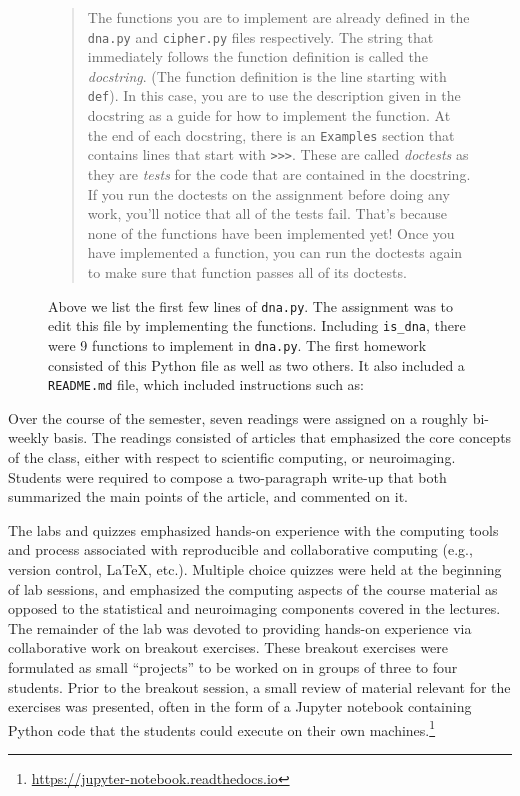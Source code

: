 
\begin{figure}
\centering

\caption{Above we list the first few lines of \texttt{dna.py}.
The assignment was to edit this file by implementing the functions.
Including \texttt{is\_dna}, there were 9 functions
to implement in \texttt{dna.py}.
The first homework consisted of this Python file as well as two others.
It also included a \texttt{README.md} file, which included instructions
such as:}\label{fig:dna}
\begin{quotation}
The functions you are to implement are already defined in the \texttt{dna.py} and
\texttt{cipher.py} files respectively. The string that immediately follows the function
definition is called the \emph{docstring}. (The function definition is the line
starting with \texttt{def}). In this case, you are to use the description given in the
docstring as a guide for how to implement the function. At the end of each
docstring, there is an \texttt{Examples} section that contains lines that start with
\verb|>>>|. These are called \emph{doctests} as they are \emph{tests} for the code that are
contained in the docstring. If you run the doctests on the assignment before
doing any work, you'll notice that all of the tests fail. That's because none
of the functions have been implemented yet! Once you have implemented a
function, you can run the doctests again to make sure that function passes all
of its doctests.
\end{quotation}
\end{figure}

Over the course of the semester, seven readings were assigned on a roughly
bi-weekly basis.
The readings consisted of articles that emphasized the core concepts
of the class, either with respect to scientific computing, or neuroimaging.
Students were required to compose a two-paragraph write-up that both summarized
the main points of the article, and commented on it.

The labs and quizzes emphasized hands-on experience with the computing tools
and process associated with reproducible and collaborative computing (e.g.,
version control, \LaTeX, etc.).
Multiple choice quizzes were held at the beginning of lab sessions, and
emphasized the computing aspects of the course material as
opposed to the statistical and neuroimaging components covered in the lectures.
The remainder of the lab was devoted to providing hands-on experience via
collaborative work on breakout exercises.
These breakout exercises were formulated as small ``projects'' to be worked on
in groups of three to four students.
Prior to the breakout session, a small review of material relevant for the
exercises was presented, often in the form of a Jupyter notebook containing
Python code that the students could execute on their own
machines.\footnote{\url{https://jupyter-notebook.readthedocs.io}}

